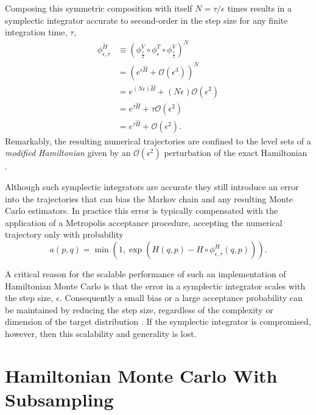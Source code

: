 \documentclass{article}
\begin{document}
%
Composing this symmetric composition with itself $N = \tau / \epsilon$ times results in 
a symplectic integrator accurate to second-order in the step size for any finite integration 
time, $\tau$,
%
\begin{align*}
\phi^{\widetilde{H}}_{\epsilon, \tau}
&\equiv
\left( \phi^{V}_{\frac{\epsilon}{2}} \circ 
\phi^{T}_{\epsilon} \circ 
\phi^{V}_{\frac{\epsilon}{2}} \right)^{N}
\\
&=
\left( e^{ \epsilon \hat{H} }
+ \mathcal{O} \! \left( \epsilon^{3} \right) \right)^{N}
\\
&=
e^{ \left( N \epsilon \right) \hat{H} }
+ \left( N \epsilon \right) \mathcal{O} \! \left( \epsilon^{2} \right)
\\
&=
e^{ \tau \hat{H} }
+ \tau \mathcal{O} \! \left( \epsilon^{2} \right)
\\
&=
e^{ \tau \hat{H} }
+ \mathcal{O} \! \left( \epsilon^{2} \right).
\end{align*}
%
Remarkably, the resulting numerical trajectories are confined to the level sets
of a \textit{modified Hamiltonian} given by an $\mathcal{O} \! \left( \epsilon^{2} \right)$
perturbation of the exact Hamiltonian \cite{HairerEtAl:2006, BetancourtEtAl:2014b}.

Although such symplectic integrators are accurate they still introduce an
error into the trajectories that can bias the Markov chain and any resulting
Monte Carlo estimators.  In practice this error is typically compensated with
the application of a Metropolis acceptance procedure, accepting the numerical
trajectory only with probability
%
\begin{equation*}
a (p, q) = \min \left(1, 
\exp \! \left( H (q, p) - H \circ \phi^{\widetilde{H}}_{\epsilon, \tau} (q, p) \right) \right).
\end{equation*}

A critical reason for the scalable performance of such an implementation of 
Hamiltonian Monte Carlo is that the error in a symplectic integrator scales 
with the step size, $\epsilon$.  Consequently a small bias or a large acceptance 
probability can be maintained by reducing the step size, regardless of the complexity
or dimension of the target distribution \cite{BetancourtEtAl:2014b}.  If the symplectic
integrator is compromised, however, then this scalability and generality is lost.

\section{Hamiltonian Monte Carlo With Subsampling}
\end{document}
